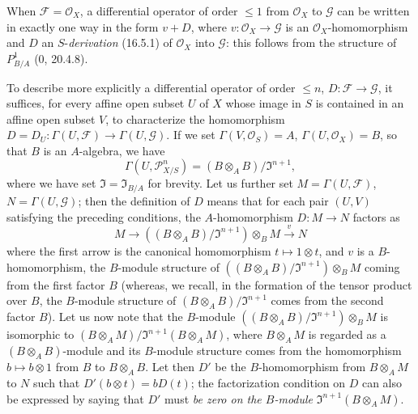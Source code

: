 When $\mathscr{F}=\mathcal{O}_X$, a differential operator of order
$\leq1$ from $\mathcal{O}_X$ to $\mathscr{G}$ can be written in exactly one
way in the form $v+D$, where $v:\mathcal{O}_X\to\mathscr{G}$ is an
$\mathcal{O}_X$-homomorphism and $D$ an $S$-\emph{derivation} (16.5.1) of
$\mathcal{O}_X$ into $\mathscr{G}$: this follows from the structure of
$P_{B/A}^1$ (0, 20.4.8).

\begin{env}[16.8.2]
\label{IV.16.8.2}
To describe more explicitly a differential operator of order
$\leq n$, $D:\mathscr{F}\to\mathscr{G}$, it suffices, for every affine open
subset $U$ of $X$ whose image in $S$ is contained in an affine open subset
$V$, to characterize the homomorphism
$D=D_U:\Gamma(U,\mathscr{F})\to\Gamma(U,\mathscr{G})$. If we set
$\Gamma(V,\mathcal{O}_S)=A$, $\Gamma(U,\mathcal{O}_X)=B$, so that $B$
is an $A$-algebra, we have
\[
  \Gamma(U,\mathscr{P}_{X/S}^n)
  =(B\otimes_A B)/\mathfrak{I}^{n+1},
\]
where we have set $\mathfrak{I}=\mathfrak{I}_{B/A}$ for brevity. Let us
further set $M=\Gamma(U,\mathscr{F})$, $N=\Gamma(U,\mathscr{G})$; then the
definition of $D$ means that for each pair $(U,V)$ satisfying the
preceding conditions, the $A$-homomorphism $D:M\to N$ factors as
\[
  M\longrightarrow
  ((B\otimes_A B)/\mathfrak{I}^{n+1})\otimes_B M
  \xrightarrow{v}N
\]
where the first arrow is the canonical homomorphism $t\mapsto1\otimes t$, and
$v$ is a $B$-homomorphism, the $B$-module structure of
$((B\otimes_A B)/\mathfrak{I}^{n+1})\otimes_B M$ coming from the first
factor $B$ (whereas, we recall, in the formation of the tensor product
over $B$, the $B$-module structure of
$(B\otimes_A B)/\mathfrak{I}^{n+1}$ comes from the second factor $B$). Let us
now note that the $B$-module
$((B\otimes_A B)/\mathfrak{I}^{n+1})\otimes_B M$ is isomorphic to
$(B\otimes_A M)/\mathfrak{I}^{n+1}(B\otimes_A M)$, where $B\otimes_A M$ is
regarded as a $(B\otimes_A B)$-module and its $B$-module structure
comes from the homomorphism $b\mapsto b\otimes1$ from $B$ to $B\otimes_A B$.
Let then $D'$ be the $B$-homomorphism from $B\otimes_A M$ to $N$ such that
$D'(b\otimes t)=bD(t)$; the factorization condition on $D$ can also be
expressed by saying that $D'$ must \emph{be zero on the $B$-module}
$\mathfrak{I}^{n+1}(B\otimes_A M)$.
\end{env}

